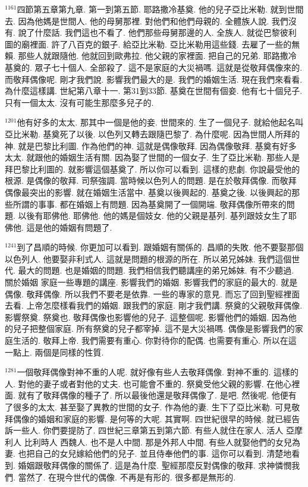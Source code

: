 \documentclass{book}
\begin{document}
$^{1161}$四節第五章第九章.
第一到第五節.
耶路撒冷基奠.
他的兒子亞比米勒.
就到世間去.
因為他媽是世間人.
他的母舅那裡.
對他們和他們母親的.
全體族人說.
我們沒有.
說了什麼話.
我們這也不看了.
他們那些母舅那邊的人.
全族人.
就從巴黎彼利圖的廟裡面.
許了八百克的銀子.
給亞比米勒.
亞比米勒用這些錢.
去雇了一些的無賴.
那些人就跟隨他.
他就回到歐弗拉.
他父親的家裡面.
把自己的兄弟.
耶路撒冷基奠的.
眾子七十個人.
全部殺了.
這不是家庭的大災禍嗎.
這就是從敬拜偶像來的.
而敬拜偶像呢.
剛才我們說.
影響我們最大的是.
我們的婚姻生活.
現在我們來看看.
為什麼這樣講.
世紀第八章十一.
第31到33節.
基奠在世間有個妾.
他有七十個兒子.
只有一個太太.
沒有可能生那麼多兒子的.

$^{1201}$他有好多的太太.
那其中一個是他的妾.
世間來的.
生了一個兒子.
就給他起名叫亞比米勒.
基奠死了以後.
以色列又轉去跟隨巴黎了.
為什麼呢.
因為世間人所拜的神.
就是巴黎比利圖.
作為他們的神.
這就是偶像敬拜.
因為偶像敬拜.
基奠有好多太太.
就跟他的婚姻生活有關.
因為娶了世間的一個女子.
生了亞比米勒.
那些人是拜巴黎比利圖的.
就影響這個基奠了.
所以你可以看到.
這樣的悲劇.
你說最受他的根源.
是偶像的敬拜.
司祭強調.
當時候以色列人的問題.
是在於敬拜偶像.
而敬拜偶像最突出的影響.
就在婚姻生活當中.
基奠以後興起的.
基奠之後.
以後興起的那些所謂的事事.
都在婚姻上有問題.
因為基奠開了一個開端.
敬拜偶像所帶來的問題.
以後有耶佛他.
耶佛他.
他的媽是個妓女.
他的父親是基列.
基列跟妓女生了耶佛他.
這是他的婚姻有問題了.

$^{1241}$到了昌順的時候.
你更加可以看到.
跟婚姻有關係的.
昌順的失敗.
他不要娶那個以色列人.
他要娶非利式人.
這就是問題的根源的所在.
所以弟兄姊妹.
我們這個世代.
最大的問題.
也是婚姻的問題.
我們相信我們聽講座的弟兄姊妹.
有不少聽過.
關於婚姻 家庭一些專題的講座.
影響我們的婚姻.
影響我們的家庭的最大的.
就是偶像.
敬拜偶像.
所以我們不要老是依靠.
一些的專家的意見.
而忘了回到聖經裡面去看.
上帝怎麼樣看我們的婚姻.
跟我們的家庭.
剛才我們講.
祭奠的父親敬拜偶像.
影響祭奠.
祭奠也.
敬拜偶像也影響他的兒子.
這整個呢.
影響他們的婚姻.
因為他的兒子把整個家庭.
所有祭奠的兒子都宰掉.
這不是大災禍嗎.
偶像是影響我們的家庭生活的.
敬拜上帝.
我們需要有重心.
你對待你的配偶.
也需要有重心.
所以在這一點上.
兩個是同樣的性質.

$^{1281}$一個敬拜偶像對神不重的人呢.
就好像有些人去敬拜偶像.
對神不重的.
這樣的人.
對他的妻子或者對他的丈夫.
也可能會不重的.
祭奠受他父親的影響.
在他心裡面.
就有了敬拜偶像的種子了.
所以最後他還是敬拜偶像了.
是吧.
然後呢.
他便有了很多的太太.
甚至娶了異教的世間的女子.
作為他的妻.
生下了亞比米勒.
可見敬拜偶像的婚姻和家庭的影響.
是何等的大呢.
其實啊.
四世紀很早的時候.
就已經告訴一些人.
你們要提防了.
四世紀三章第五到第六節.
有些人就住在家人.
活人 亞摩利人 比利時人 西魏人.
也不是人中間.
那是外邦人中間.
有些人就娶他們的女兒為妻.
也把自己的女兒嫁給他們的兒子.
並且侍奉他們的事.
這你可以看到.
清楚地看到.
婚姻跟敬拜偶像的關係了.
這是為什麼.
聖經那麼反對偶像的敬拜.
求神憐憫我們.
當然了.
在現今世代的偶像.
不再是有形的.
很多都是無形的.
\end{document}
